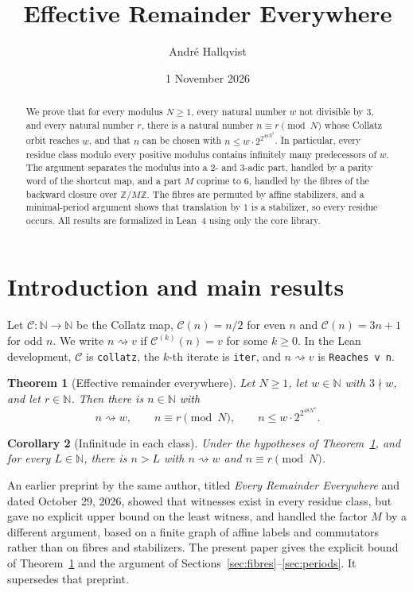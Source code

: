 \documentclass[11pt,reqno,oneside]{amsart}
\title[Effective Remainder Everywhere]{Effective Remainder Everywhere}
\author{André Hallqvist}
\date{1 November 2026}
\theoremstyle{plain}
\newtheorem{theorem}{Theorem}[section]
\newtheorem{corollary}[theorem]{Corollary}
\theoremstyle{definition}
\numberwithin{equation}{section}
\newcommand{\lean}[1]{\texttt{#1}}
\begin{document}
\pagestyle{plain}

\begin{abstract}
We prove that for every modulus $N\ge1$, every natural number $w$ not divisible by $3$, and every natural number $r$, there is a natural number $n\equiv r\pmod N$ whose Collatz orbit reaches $w$, and that $n$ can be chosen with $n\le w\cdot2^{2^{48N^4}}$. In particular, every residue class modulo every positive modulus contains infinitely many predecessors of $w$. The argument separates the modulus into a $2$- and $3$-adic part, handled by a parity word of the shortcut map, and a part $M$ coprime to $6$, handled by the fibres of the backward closure over $\mathbb Z/M\mathbb Z$. The fibres are permuted by affine stabilizers, and a minimal-period argument shows that translation by $1$ is a stabilizer, so every residue occurs. All results are formalized in Lean~4 using only the core library.
\end{abstract}
\maketitle

\section{Introduction and main results}\label{sec:intro}

Let $\mathcal C\colon\mathbb N\to\mathbb N$ be the Collatz map, $\mathcal C(n)=n/2$ for even $n$ and $\mathcal C(n)=3n+1$ for odd $n$. We write $n\rightsquigarrow v$ if $\mathcal C^{(k)}(n)=v$ for some $k\ge0$. In the Lean development, $\mathcal C$ is \lean{collatz}, the $k$-th iterate is \lean{iter}, and $n\rightsquigarrow v$ is \lean{Reaches v n}.

\begin{theorem}[Effective remainder everywhere]\label{thm:main}
Let $N\ge1$, let $w\in\mathbb N$ with $3\nmid w$, and let $r\in\mathbb N$. Then there is $n\in\mathbb N$ with
\[
n\rightsquigarrow w,\qquad n\equiv r\pmod N,\qquad n\le w\cdot 2^{2^{48N^4}}.
\]
\end{theorem}

\begin{corollary}[Infinitude in each class]\label{cor:infinite}
Under the hypotheses of Theorem~\ref{thm:main}, and for every $L\in\mathbb N$, there is $n>L$ with $n\rightsquigarrow w$ and $n\equiv r\pmod N$.
\end{corollary}

An earlier preprint by the same author, titled \emph{Every Remainder Everywhere} and dated October 29, 2026, showed that witnesses exist in every residue class, but gave no explicit upper bound on the least witness, and handled the factor $M$ by a different argument, based on a finite graph of affine labels and commutators rather than on fibres and stabilizers. The present paper gives the explicit bound of Theorem~\ref{thm:main} and the argument of Sections~\ref{sec:fibres}--\ref{sec:periods}. It supersedes that preprint.
\end{document}
